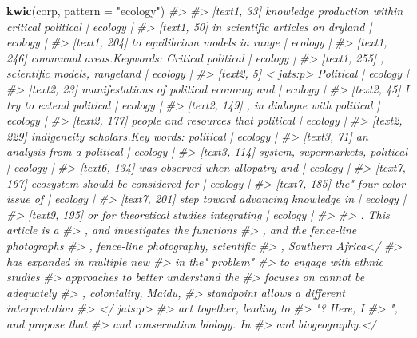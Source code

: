 \documentclass[author-year, review, 11pt]{components/elsarticle} %
\newenvironment{Shaded}{\begin{snugshade}}{\end{snugshade}}
\newcommand{\CommentTok}[1]{\textcolor[rgb]{0.56,0.35,0.01}{\textit{#1}}}
\newcommand{\DataTypeTok}[1]{\textcolor[rgb]{0.13,0.29,0.53}{#1}}
\newcommand{\KeywordTok}[1]{\textcolor[rgb]{0.13,0.29,0.53}{\textbf{#1}}}
\newcommand{\NormalTok}[1]{#1}
\newcommand{\StringTok}[1]{\textcolor[rgb]{0.31,0.60,0.02}{#1}}
\begin{document}
\begin{Shaded}
\begin{Highlighting}[]
\KeywordTok{kwic}\NormalTok{(corp, }\DataTypeTok{pattern =} \StringTok{"ecology"}\NormalTok{)}
\CommentTok{#>                                                                         }
\CommentTok{#>   [text1, 33] knowledge production within critical political | ecology |}
\CommentTok{#>   [text1, 50]              in scientific articles on dryland | ecology |}
\CommentTok{#>  [text1, 204]                 to equilibrium models in range | ecology |}
\CommentTok{#>  [text1, 246]    communal areas.Keywords: Critical political | ecology |}
\CommentTok{#>  [text1, 255]                 , scientific models, rangeland | ecology |}
\CommentTok{#>    [text2, 5]                            < jats:p> Political | ecology |}
\CommentTok{#>   [text2, 23]        manifestations of political economy and | ecology |}
\CommentTok{#>   [text2, 45]                      I try to extend political | ecology |}
\CommentTok{#>  [text2, 149]                   , in dialogue with political | ecology |}
\CommentTok{#>  [text2, 177]            people and resources that political | ecology |}
\CommentTok{#>  [text2, 229]      indigeneity scholars.Key words: political | ecology |}
\CommentTok{#>   [text3, 71]                   an analysis from a political | ecology |}
\CommentTok{#>  [text3, 114]                system, supermarkets, political | ecology |}
\CommentTok{#>  [text6, 134]                was observed when allopatry and | ecology |}
\CommentTok{#>  [text7, 167]             ecosystem should be considered for | ecology |}
\CommentTok{#>  [text7, 185]                       the" four-color issue of | ecology |}
\CommentTok{#>  [text7, 201]             step toward advancing knowledge in | ecology |}
\CommentTok{#>  [text9, 195]         or for theoretical studies integrating | ecology |}
\CommentTok{#>                                              }
\CommentTok{#>  . This article is a                         }
\CommentTok{#>  , and investigates the functions            }
\CommentTok{#>  , and the fence-line photographs            }
\CommentTok{#>  , fence-line photography, scientific        }
\CommentTok{#>  , Southern Africa</                         }
\CommentTok{#>  has expanded in multiple new                }
\CommentTok{#>  in the" problem"                            }
\CommentTok{#>  to engage with ethnic studies               }
\CommentTok{#>  approaches to better understand the         }
\CommentTok{#>  focuses on cannot be adequately             }
\CommentTok{#>  , coloniality, Maidu,                       }
\CommentTok{#>  standpoint allows a different interpretation}
\CommentTok{#>  </ jats:p>                                  }
\CommentTok{#>  act together, leading to                    }
\CommentTok{#>  "? Here, I                                  }
\CommentTok{#>  ", and propose that                         }
\CommentTok{#>  and conservation biology. In                }
\CommentTok{#>  and biogeography.</}
\end{Highlighting}
\end{Shaded}
\end{document}
